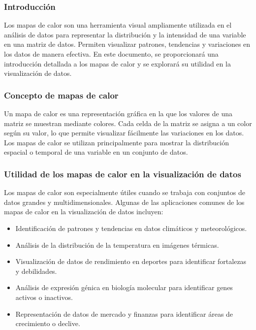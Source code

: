 \documentclass{article}
\begin{document}
\subsubsection{Introducción}
Los mapas de calor son una herramienta visual ampliamente utilizada en el análisis de datos para representar la distribución y la intensidad de una variable en una matriz de datos. Permiten visualizar patrones, tendencias y variaciones en los datos de manera efectiva. En este documento, se proporcionará una introducción detallada a los mapas de calor y se explorará su utilidad en la visualización de datos.

\subsubsection{Concepto de mapas de calor}
Un mapa de calor es una representación gráfica en la que los valores de una matriz se muestran mediante colores. Cada celda de la matriz se asigna a un color según su valor, lo que permite visualizar fácilmente las variaciones en los datos. Los mapas de calor se utilizan principalmente para mostrar la distribución espacial o temporal de una variable en un conjunto de datos.

\subsubsection{Utilidad de los mapas de calor en la visualización de datos}
Los mapas de calor son especialmente útiles cuando se trabaja con conjuntos de datos grandes y multidimensionales. Algunas de las aplicaciones comunes de los mapas de calor en la visualización de datos incluyen:

\begin{itemize}
    \item Identificación de patrones y tendencias en datos climáticos y meteorológicos.
    \item Análisis de la distribución de la temperatura en imágenes térmicas.
    \item Visualización de datos de rendimiento en deportes para identificar fortalezas y debilidades.
    \item Análisis de expresión génica en biología molecular para identificar genes activos o inactivos.
    \item Representación de datos de mercado y finanzas para identificar áreas de crecimiento o declive.
\end{itemize}
\end{document}
